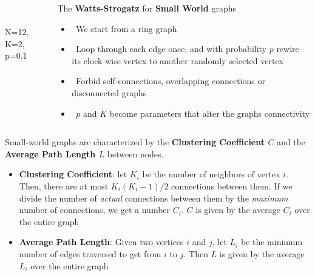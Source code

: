 \documentclass[serif,mathserif]{beamer}
\begin{document}
\begin{frame}
    \begin{columns}
        \begin{column}{.5\textwidth}
            \\
            \vspace{0.1cm}
            \\
            N=12, K=2, p=0.1
        \end{column}
        \begin{column}{.5\textwidth}
            The \textbf{Watts-Strogatz} for \textbf{Small World} graphs
            \begin{itemize}
                \vspace{0.25cm}
                \item \ \pause We start from a ring graph
                \vspace{0.25cm}
                \item \ \pause Loop through each edge once, and with probability $p$ rewire its clock-wise vertex to another randomly selected vertex
                \vspace{0.25cm}
                \item \ \pause Forbid self-connections, overlapping connections or disconnected graphs
                \vspace{0.25cm}
                \item \ \pause $p$ and $K$ become parameters that alter the graphs connectivity
            \end{itemize}
        \end{column}
    \end{columns}
\end{frame}

\begin{frame}
    Small-world graphs are characterized by the \textbf{Clustering Coefficient $C$} and the \textbf{Average Path Length $L$} between nodes.\\
    \begin{itemize}
        \vspace{0.25cm}
        \item \textbf{Clustering Coefficient}: let $K_i$ be the number of neighbors of vertex $i$. Then, there are at most $K_i(K_i-1)/2$ connections between them. If we divide the number of \emph{actual} connections between them by the \emph{maximum} number of connections, we get a number $C_i$. $C$ is given by the average $C_i$ over the entire graph
        \vspace{0.25cm}
        \item \textbf{Average Path Length}: Given two vertices $i$ and $j$, let $L_i$ be the minimum number of edges traversed to get from $i$ to $j$. Then $L$ is given by the average $L_i$ over the entire graph
    \end{itemize}
\end{frame}
\end{document}
